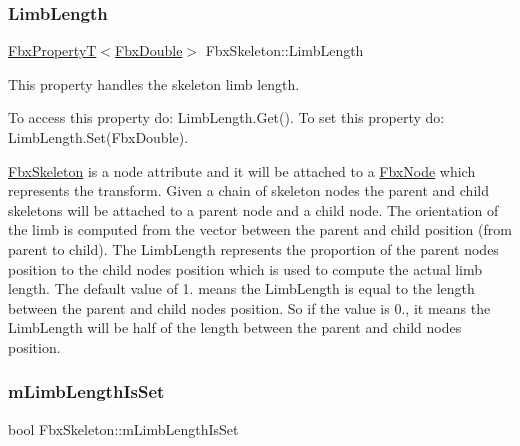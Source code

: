 \subsubsection{\texorpdfstring{Limb\+Length}{LimbLength}}
{\footnotesize\ttfamily \hyperlink{class_fbx_property_t}{Fbx\+PropertyT}$<$\hyperlink{fbxtypes_8h_a171e72a1c46fc15c1a6c9c31948c1c5b}{Fbx\+Double}$>$ Fbx\+Skeleton\+::\+Limb\+Length}

This property handles the skeleton limb length.

To access this property do\+: Limb\+Length.\+Get(). To set this property do\+: Limb\+Length.\+Set(\+Fbx\+Double).

\hyperlink{class_fbx_skeleton}{Fbx\+Skeleton} is a node attribute and it will be attached to a \hyperlink{class_fbx_node}{Fbx\+Node} which represents the transform. Given a chain of skeleton nodes the parent and child skeletons will be attached to a parent node and a child node. The orientation of the limb is computed from the vector between the parent and child position (from parent to child). The Limb\+Length represents the proportion of the parent node\textquotesingle{}s position to the child node\textquotesingle{}s position which is used to compute the actual limb length. The default value of 1. means the Limb\+Length is equal to the length between the parent and child node\textquotesingle{}s position. So if the value is 0., it means the Limb\+Length will be half of the length between the parent and child node\textquotesingle{}s position. \mbox{\label{class_fbx_skeleton_a59c001b86207731c5c26ca38ec1e78f6}} 
\subsubsection{\texorpdfstring{m\+Limb\+Length\+Is\+Set}{mLimbLengthIsSet}}
{\footnotesize\ttfamily bool Fbx\+Skeleton\+::m\+Limb\+Length\+Is\+Set\hspace{0.3cm}{\ttfamily [protected]}}

\mbox{\label{class_fbx_skeleton_a9efa86b9d964e60e8a9ed67a4851fc9f}} 
